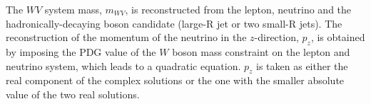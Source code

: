The $WV$ system mass, $m_{WV}$, is reconstructed from the lepton, neutrino and the hadronically-decaying boson candidate (large-R jet or two small-R jets).
The reconstruction of the momentum of the neutrino in the $z$-direction, $p_z$, is obtained by imposing the PDG value of the $W$ boson mass constraint on the lepton and neutrino system, which leads to a quadratic equation. $p_z$ is taken as either the real component of the complex solutions or the one with the smaller absolute value of the two real solutions.






